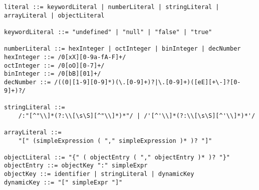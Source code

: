 \begin{lstlisting}
literal ::= keywordLiteral | numberLiteral | stringLiteral | arrayLiteral | objectLiteral

keywordLiteral ::= "undefined" | "null" | "false" | "true"

numberLiteral ::= hexInteger | octInteger | binInteger | decNumber
hexInteger ::= /0[xX][0-9a-fA-F]+/
octInteger ::= /0[oO][0-7]+/
binInteger ::= /0[bB][01]+/
decNumber ::= /((0|[1-9][0-9]*)(\.[0-9]+)?|\.[0-9]+)([eE][+\-]?[0-9]+)?/

stringLiteral ::=
	/:"[^"\\]*(?:\\[\s\S][^"\\]*)*"/ | /'[^'\\]*(?:\\[\s\S][^'\\]*)*'/

arrayLiteral ::=
	"[" (simpleExpression ( "," simpleExpression )* )? "]"

objectLiteral ::= "{" ( objectEntry ( "," objectEntry )* )? "}"
objectEntry ::= objectKey ":" simpleExpr
objectKey ::= identifier | stringLiteral | dynamicKey
dynamicKey ::= "[" simpleExpr "]"
\end{lstlisting}
